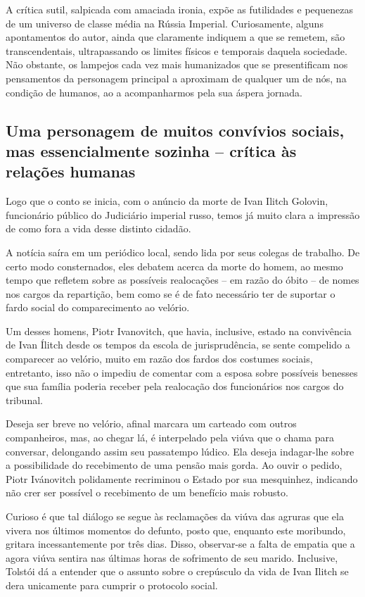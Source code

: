\documentclass{extarticle}
\begin{document}
A crítica sutil, salpicada com amaciada ironia, expõe as futilidades e
pequenezas de um universo de classe média na Rússia Imperial.
Curiosamente, alguns apontamentos do autor, ainda que claramente
indiquem a que se remetem, são transcendentais, ultrapassando os limites
físicos e temporais daquela sociedade. Não obstante, os lampejos cada
vez mais humanizados que se presentificam nos pensamentos da personagem
principal a aproximam de qualquer um de nós, na condição de humanos, ao
a acompanharmos pela sua áspera jornada.

\subsection{Uma personagem de muitos convívios sociais, mas essencialmente
sozinha -- crítica às relações humanas}

Logo que o conto se inicia, com o anúncio da morte de Ivan Ilitch
Golovin, funcionário público do Judiciário imperial russo, temos já
muito clara a impressão de como fora a vida desse distinto cidadão.

A notícia saíra em um periódico local, sendo lida por seus colegas de
trabalho. De certo modo consternados, eles debatem acerca da morte do
homem, ao mesmo tempo que refletem sobre as possíveis realocações -- em
razão do óbito -- de nomes nos cargos da repartição, bem como se é de
fato necessário ter de suportar o fardo social do comparecimento ao
velório.

Um desses homens, Piotr Ivanovitch, que havia, inclusive, estado na
convivência de Ivan Ílitch desde os tempos da escola de jurisprudência,
se sente compelido a comparecer ao velório, muito em razão dos fardos
dos costumes sociais, entretanto, isso não o impediu de comentar com a
esposa sobre possíveis benesses que sua família poderia receber pela
realocação dos funcionários nos cargos do tribunal.

Deseja ser breve no velório, afinal marcara um carteado com outros
companheiros, mas, ao chegar lá, é interpelado pela viúva que o chama
para conversar, delongando assim seu passatempo lúdico. Ela deseja
indagar-lhe sobre a possibilidade do recebimento de uma pensão mais
gorda. Ao ouvir o pedido, Piotr Ivánovitch polidamente recriminou o
Estado por sua mesquinhez, indicando não crer ser possível o recebimento
de um benefício mais robusto.

Curioso é que tal diálogo se segue às reclamações da viúva das agruras
que ela vivera nos últimos momentos do defunto, posto que, enquanto este
moribundo, gritara incessantemente por três dias. Disso, observar-se a
falta de empatia que a agora viúva sentira nas últimas horas de
sofrimento de seu marido. Inclusive, Tolstói dá a entender que o assunto
sobre o crepúsculo da vida de Ivan Ilitch se dera unicamente para
cumprir o protocolo social.
\end{document}
